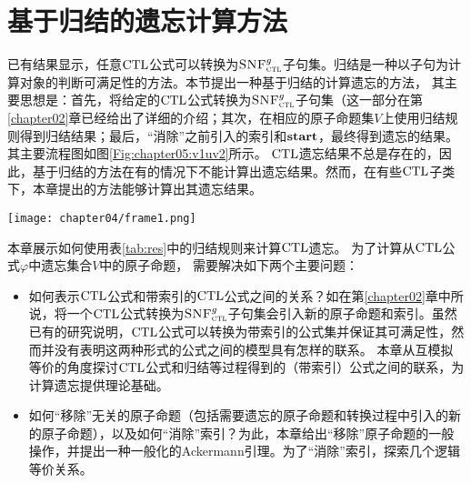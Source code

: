 \section{基于归结的遗忘计算方法}
\label{chapter05:sec:resolution}
	已有结果显示，任意$\textrm{CTL}$公式可以转换为${\textsc{SNF}_{\textsc{ctl}}^g}$子句集。归结是一种以子句为计算对象的判断可满足性的方法。本节提出一种基于归结的计算遗忘的方法，
	其主要思想是：首先，将给定的$\textrm{CTL}$公式转换为${\textsc{SNF}_{\textsc{ctl}}^g}$子句集（这一部分在第\ref{chapter02}章已经给出了详细的介绍；其次，在相应的原子命题集$V$上使用归结规则得到归结结果；最后，“消除”之前引入的索引和$\textbf{start}$，最终得到遗忘的结果。其主要流程图如图\ref{Fig:chapter05:v1uv2}所示。
	$\textrm{CTL}$遗忘结果不总是存在的，因此，基于归结的方法在有的情况下不能计算出遗忘结果。然而，在有些$\textrm{CTL}$子类下，本章提出的方法能够计算出其遗忘结果。
\begin{figure*}[!htb]
	\centering
	\texttt{[image: chapter04/frame1.png]}\\
	\caption{基于归结的遗忘的主要流程图}
	\label{Fig:chapter05:v1uv2}
\end{figure*}

本章展示如何使用表\ref{tab:res}中的归结规则来计算$\textrm{CTL}$遗忘。
为了计算从$\textrm{CTL}$公式$\varphi$中遗忘集合$V$中的原子命题，
需要解决如下两个主要问题：
\begin{itemize}
	\item[(1)] 如何表示$\textrm{CTL}$公式和带索引的$\textrm{CTL}$公式之间的关系？如在第\ref{chapter02}章中所说，将一个$\textrm{CTL}$公式转换为${\textsc{SNF}_{\textsc{ctl}}^g}$子句集会引入新的原子命题和索引。虽然已有的研究说明，$\textrm{CTL}$公式可以转换为带索引的公式集并保证其可满足性，然而并没有表明这两种形式的公式之间的模型具有怎样的联系。
	本章从互模拟等价的角度探讨$\textrm{CTL}$公式和归结等过程得到的（带索引）公式之间的联系，为计算遗忘提供理论基础。
	\item[(2)] 如何“移除”无关的原子命题（包括需要遗忘的原子命题和转换过程中引入的新的原子命题），以及如何“消除”索引？为此，本章给出“移除”原子命题的一般操作，并提出一种一般化的Ackermann引理。为了“消除”索引，探索几个逻辑等价关系。%
\end{itemize}

